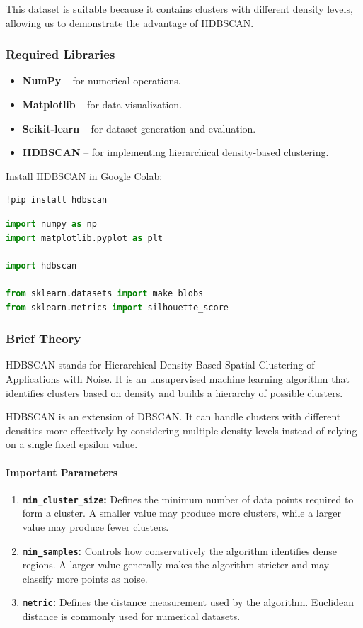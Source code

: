 \documentclass[a4paper,11pt]{article}
\begin{document}
This dataset is suitable because it contains clusters with different density levels, allowing us to demonstrate the advantage of HDBSCAN.

\subsubsection{Required Libraries}
\begin{itemize}
    \item \textbf{NumPy} -- for numerical operations.
    \item \textbf{Matplotlib} -- for data visualization.
    \item \textbf{Scikit-learn} -- for dataset generation and evaluation.
    \item \textbf{HDBSCAN} -- for implementing hierarchical density-based clustering.
\end{itemize}

Install HDBSCAN in Google Colab:
\begin{lstlisting}[language=Python, caption={Install hdbscan}]
!pip install hdbscan
\end{lstlisting}

\begin{lstlisting}[language=Python, caption={Required Imports}]
import numpy as np
import matplotlib.pyplot as plt

import hdbscan

from sklearn.datasets import make_blobs
from sklearn.metrics import silhouette_score
\end{lstlisting}

\subsubsection{Brief Theory}
HDBSCAN stands for Hierarchical Density-Based Spatial Clustering of Applications with Noise. It is an unsupervised machine learning algorithm that identifies clusters based on density and builds a hierarchy of possible clusters.

HDBSCAN is an extension of DBSCAN. It can handle clusters with different densities more effectively by considering multiple density levels instead of relying on a single fixed epsilon value.

\paragraph{Important Parameters}
\begin{enumerate}
    \item \textbf{\texttt{min\_cluster\_size}:} Defines the minimum number of data points required to form a cluster. A smaller value may produce more clusters, while a larger value may produce fewer clusters.
    \item \textbf{\texttt{min\_samples}:} Controls how conservatively the algorithm identifies dense regions. A larger value generally makes the algorithm stricter and may classify more points as noise.
    \item \textbf{\texttt{metric}:} Defines the distance measurement used by the algorithm. Euclidean distance is commonly used for numerical datasets.
\end{enumerate}
\end{document}
